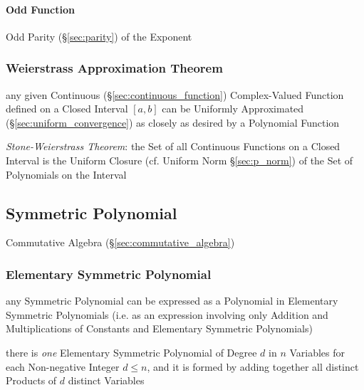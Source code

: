 \paragraph{Odd Function}\label{sec:odd_function}\hfill

Odd Parity (\S\ref{sec:parity}) of the Exponent



\subsubsection{Weierstrass Approximation Theorem}
\label{sec:weierstrass_approximation}

any given Continuous (\S\ref{sec:continuous_function}) Complex-Valued Function
defined on a Closed Interval $[a,b]$ can be Uniformly Approximated
(\S\ref{sec:uniform_convergence}) as closely as desired by a Polynomial Function

\emph{Stone-Weierstrass Theorem}: the Set of all Continuous Functions on a
Closed Interval is the Uniform Closure (cf. Uniform Norm \S\ref{sec:p_norm}) of
the Set of Polynomials on the Interval



\subsection{Symmetric Polynomial}\label{sec:symmetric_polynomial}

\fist Commutative Algebra (\S\ref{sec:commutative_algebra})



\subsubsection{Elementary Symmetric Polynomial}\label{sec:elementary_symmetric}

any Symmetric Polynomial can be expressed as a Polynomial in Elementary
Symmetric Polynomials (i.e. as an expression involving only Addition and
Multiplications of Constants and Elementary Symmetric Polynomials)

there is \emph{one} Elementary Symmetric Polynomial of Degree $d$ in $n$
Variables for each Non-negative Integer $d \leq n$, and it is formed by adding
together all distinct Products of $d$ distinct Variables



